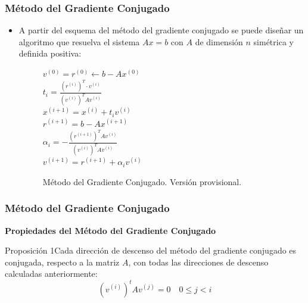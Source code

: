 \documentclass[10pt]{beamer}
\begin{document}
\begin{frame}
  \frametitle{M\'etodo del Gradiente Conjugado}
  \begin{itemize}
    \item<1->A partir del esquema del m\'etodo del gradiente conjugado se puede dise\~nar un algoritmo que resuelva el sistema $Ax = b$ con $A$ de dimensi\'on $n$ sim\'etrica y definida positiva:
    \vspace{-0.35cm}
    \begin{figure}[h]
    \begin{algorithm}[H]
     \caption{M\'etodo del Gradiente Conjugado. Versi\'on provisional.}
    $v^{(0)}=r^{(0)} \leftarrow b -Ax^{(0)}$\\
     {
    $t_i = \displaystyle\frac{(r^{(i)})^T\cdot v^{(i)}}{(v^{(i)})^TAv^{(i)}}$\\
    $x^{(i+1)} = x^{(i)} + t_iv^{(i)}$\\
    $r^{(i+1)} = b -Ax^{(i+1)}$\\
    $\alpha_i = -\displaystyle\frac{(r^{(i+1)})^TAv^{(i)}}{(v^{(i)})^TAv^{(i)}}$\\
    $v^{(i+1)}=r^{(i+1)}+\alpha_iv^{(i)}$\\
    }
    \end{algorithm}
    \end{figure}
  \end{itemize}
\end{frame}
\begin{frame}
  \frametitle{M\'etodo del Gradiente Conjugado}{\bf Propiedades del M\'etodo del Gradiente Conjugado}
  \begin{block}{Proposici\'on 1}Cada direcci\'on de descenso del m\'etodo del gradiente conjugado es conjugada, respecto a la matriz $A$, con todas las direcciones de descenso calculadas anteriormente:
    $$
     (v^{(i)})^tAv^{(j)} = 0 \quad 0\leq j<i
    $$
  \end{block} 
\end{frame}
\end{document}
